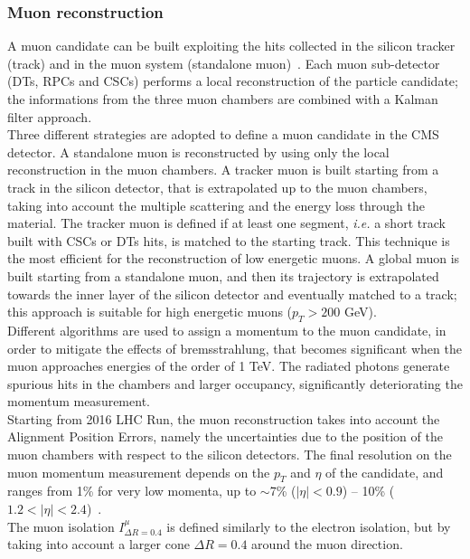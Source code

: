 \subsubsection{Muon reconstruction}
A muon candidate can be built exploiting the hits collected in the silicon tracker (track) and in the muon system (standalone muon)~\cite{Chatrchyan:2012xi}. Each muon sub-detector (DTs, RPCs and CSCs) performs a local reconstruction of the particle candidate; the informations from the three muon chambers are combined with a Kalman filter approach.\\
Three different strategies are adopted to define a muon candidate in the CMS detector. A standalone muon is reconstructed by using only the local reconstruction in the muon chambers. A tracker muon is built starting from a track in the silicon detector, that is extrapolated up to the muon chambers, taking into account the multiple scattering and the energy loss through the material. The tracker muon is defined if at least one segment, \textit{i.e.} a short track built with CSCs or DTs hits, is matched to the starting track. This technique is the most efficient for the reconstruction of low energetic muons. A global muon is built starting from a standalone muon, and then its trajectory is extrapolated towards the inner layer of the silicon detector and eventually matched to a track; this approach is suitable for high energetic muons ($p_T>200$ GeV).\\
Different algorithms are used to assign a momentum to the muon candidate, in order to mitigate the effects of bremsstrahlung, that becomes significant when the muon approaches energies of the order of 1 TeV. The radiated photons generate spurious hits in the chambers and larger occupancy, significantly deteriorating the momentum measurement.\\
Starting from 2016 LHC Run, the muon reconstruction takes into account the Alignment Position Errors, namely the uncertainties due to the position of the muon chambers with respect to the silicon detectors. The final resolution on the muon momentum measurement depends on the $p_T$ and $\eta$ of the candidate, and ranges from 1\% for very low momenta, up to $\sim$7\% ($|\eta|<0.9$) -- 10\% ($1.2 < |\eta| < 2.4$)~\cite{CMS-DP-2016-067}.\\
The muon isolation $I_{\Delta R = 0.4}^{\mu}$ is defined similarly to the electron isolation, but by taking into account a larger cone $\Delta R = 0.4$ around the muon direction.

